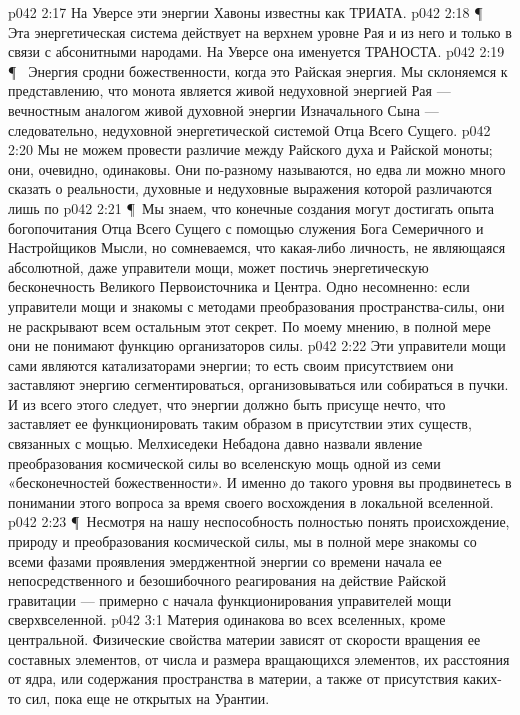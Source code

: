 \vs p042 2:17 На Уверсе эти энергии Хавоны известны как ТРИАТА.
\vs p042 2:18 \P\ \bibnobreakspace {} Эта энергетическая система действует на верхнем уровне Рая и из него и только в связи с абсонитными народами. На Уверсе она именуется ТРАНОСТА.
\vs p042 2:19 \P\ \bibnobreakspace {} Энергия сродни божественности, когда это Райская энергия. Мы склоняемся к представлению, что монота является живой недуховной энергией Рая --- вечностным аналогом живой духовной энергии Изначального Сына --- следовательно, недуховной энергетической системой Отца Всего Сущего.
\vs p042 2:20 Мы не можем провести различие между  Райского духа и Райской моноты; они, очевидно, одинаковы. Они по\hyp{}разному называются, но едва ли можно много сказать о реальности, духовные и недуховные выражения которой различаются лишь по 
\vs p042 2:21 \P\ Мы знаем, что конечные создания могут достигать опыта богопочитания Отца Всего Сущего с помощью служения Бога Семеричного и Настройщиков Мысли, но сомневаемся, что какая\hyp{}либо личность, не являющаяся абсолютной, даже управители мощи, может постичь энергетическую бесконечность Великого Первоисточника и Центра. Одно несомненно: если управители мощи и знакомы с методами преобразования пространства\hyp{}силы, они не раскрывают всем остальным этот секрет. По моему мнению, в полной мере они не понимают функцию организаторов силы.
\vs p042 2:22 Эти управители мощи сами являются катализаторами энергии; то есть своим присутствием они заставляют энергию сегментироваться, организовываться или собираться в пучки. И из всего этого следует, что энергии должно быть присуще нечто, что заставляет ее функционировать таким образом в присутствии этих существ, связанных с мощью. Мелхиседеки Небадона давно назвали явление преобразования космической силы во вселенскую мощь одной из семи «бесконечностей божественности». И именно до такого уровня вы продвинетесь в понимании этого вопроса за время своего восхождения в локальной вселенной.
\vs p042 2:23 \P\ Несмотря на нашу неспособность полностью понять происхождение, природу и преобразования космической силы, мы в полной мере знакомы со всеми фазами проявления эмерджентной энергии со времени начала ее непосредственного и безошибочного реагирования на действие Райской гравитации --- примерно с начала функционирования управителей мощи сверхвселенной.
\vs p042 3:1 Материя одинакова во всех вселенных, кроме центральной. Физические свойства материи зависят от скорости вращения ее составных элементов, от числа и размера вращающихся элементов, их расстояния от ядра, или содержания пространства в материи, а также от присутствия каких\hyp{}то сил, пока еще не открытых на Урантии.
